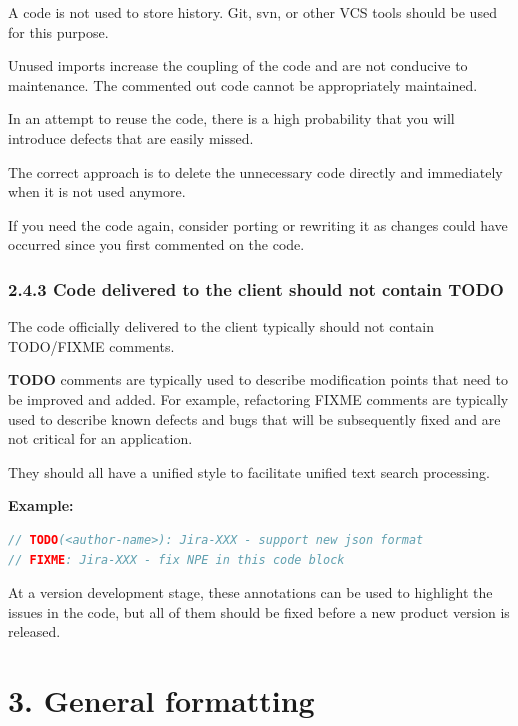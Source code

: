 {{{{{{{{{{{{{{{{A code is not used to store history. Git, svn, or other VCS tools should be used for this purpose.

Unused imports increase the coupling of the code and are not conducive to maintenance. The commented out code cannot be appropriately maintained.

In an attempt to reuse the code, there is a high probability that you will introduce defects that are easily missed.

The correct approach is to delete the unnecessary code directly and immediately when it is not used anymore.

If you need the code again, consider porting or rewriting it as changes could have occurred since you first commented on the code. 



\subsubsection*{\textbf{2.4.3 Code delivered to the client should not contain TODO}}
\leavevmode\newline

\label{sec:2.4.3}



The code officially delivered to the client typically should not contain TODO/FIXME comments.

\textbf{TODO} comments are typically used to describe modification points that need to be improved and added. For example, refactoring FIXME comments are typically used to describe known defects and bugs that will be subsequently fixed and are not critical for an application.

They should all have a unified style to facilitate unified text search processing.



\textbf{Example:}



\begin{lstlisting}[language=Kotlin]
// TODO(<author-name>): Jira-XXX - support new json format
// FIXME: Jira-XXX - fix NPE in this code block
\end{lstlisting}


At a version development stage, these annotations can be used to highlight the issues in the code, but all of them should be fixed before a new product version is released.

\section*{\textbf{3. General formatting}}

}}}}}}}}}}}}}}}}
